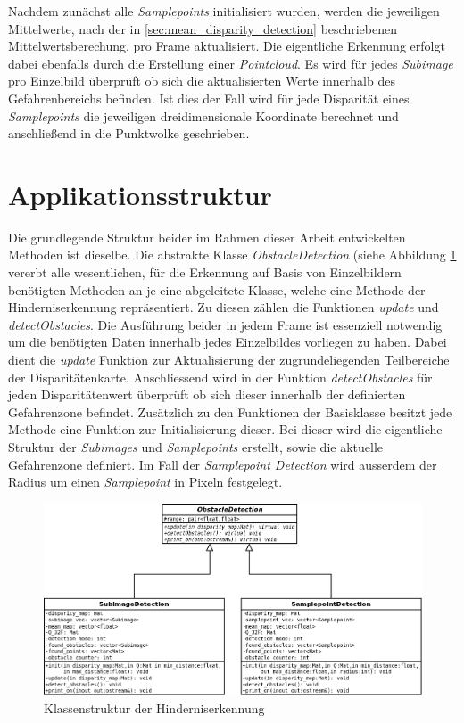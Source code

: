 \noindent
Nachdem zunächst alle \emph{Samplepoints} initialisiert wurden, werden die jeweiligen Mittelwerte, nach der in \ref{sec:mean_disparity_detection} beschriebenen Mittelwertsberechung, pro Frame aktualisiert. Die eigentliche Erkennung erfolgt dabei ebenfalls durch die Erstellung einer \emph{Pointcloud}. Es wird für jedes \emph{Subimage} pro Einzelbild überprüft ob sich die aktualisierten Werte innerhalb des Gefahrenbereichs befinden. Ist dies der Fall wird für jede Disparität eines \emph{Samplepoints} die jeweiligen dreidimensionale Koordinate berechnet und anschließend in die Punktwolke geschrieben.

\section{Applikationsstruktur}
\label{sec:structure}

Die grundlegende Struktur beider im Rahmen dieser Arbeit entwickelten Methoden ist dieselbe. Die abstrakte Klasse \emph{ObstacleDetection} (siehe Abbildung \ref{fig:obstacle_detection_structure} vererbt alle wesentlichen, für die Erkennung auf Basis von Einzelbildern benötigten Methoden an je eine abgeleitete Klasse, welche eine Methode der Hinderniserkennung repräsentiert. Zu diesen zählen die Funktionen \emph{update} und \emph{detectObstacles}. Die Ausführung beider in jedem Frame ist essenziell notwendig um die benötigten Daten innerhalb jedes Einzelbildes vorliegen zu haben. Dabei dient die \emph{update} Funktion zur Aktualisierung der zugrundeliegenden Teilbereiche der Disparitätenkarte. Anschliessend wird in der Funktion \emph{detectObstacles} für jeden Disparitätenwert überprüft ob sich dieser innerhalb der definierten Gefahrenzone befindet. Zusätzlich zu den Funktionen der Basisklasse besitzt jede Methode eine Funktion zur Initialisierung dieser. Bei dieser wird die eigentliche Struktur der \emph{Subimages} und \emph{Samplepoints} erstellt, sowie die aktuelle Gefahrenzone definiert. Im Fall der \emph{Samplepoint Detection} wird ausserdem der Radius um einen \emph{Samplepoint} in Pixeln festgelegt.

\begin{figure}[h]
	\begin{center}
		\includegraphics[width=13cm]{img/class_structure}
	\end{center}
	\caption{Klassenstruktur der Hinderniserkennung}
	\label{fig:obstacle_detection_structure}
\end{figure}


